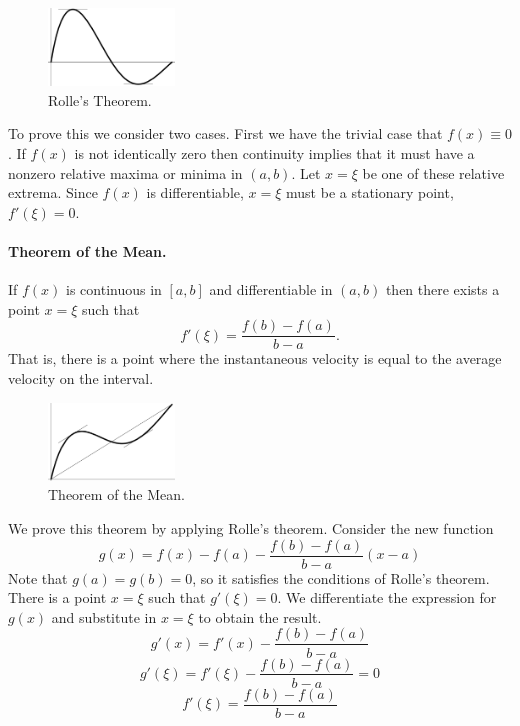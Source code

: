 \begin{figure}[h!]
  \begin{center}
    \includegraphics[width=0.3\textwidth]{calculus/differential/rolle}
  \end{center}
  \caption{Rolle's Theorem.}
  \label{rolle}
\end{figure}

To prove this we consider two cases.  First we have the 
trivial case that $f(x) \equiv 0$.  If $f(x)$ is not identically zero
then continuity implies that it must have a nonzero relative maxima or 
minima in $(a,b)$.  Let $x = \xi$ be one of these relative extrema.
Since $f(x)$ is differentiable, $x = \xi$ must be a stationary point,
$f'(\xi) = 0$.



\paragraph{Theorem of the Mean.}
If $f(x)$ is continuous in $[a,b]$ and differentiable in $(a,b)$ then there
exists a point $x = \xi$ such that
\[
f'(\xi) = \frac{f(b) - f(a)}{b - a}.
\]
That is, there is a point where the instantaneous velocity is equal to 
the average velocity on the interval.  

\begin{figure}[h!]
  \begin{center}
    \includegraphics[width=0.3\textwidth]{calculus/differential/themean}
  \end{center}
  \caption{Theorem of the Mean.}
  \label{themean}
\end{figure}

We prove this theorem by applying
Rolle's theorem.  Consider the new function
\[
g(x) = f(x) - f(a) - \frac{f(b) - f(a)}{b - a} (x - a)
\]
Note that $g(a) = g(b) = 0$, so it satisfies the conditions of Rolle's 
theorem.  There is a point $x = \xi$ such that $g'(\xi) = 0$.
We differentiate the expression for $g(x)$ and substitute in $x = \xi$ to 
obtain the result.
\[
g'(x) = f'(x)  - \frac{f(b) - f(a)}{b-a} 
\]
\[
g'(\xi) = f'(\xi)  - \frac{f(b) - f(a)}{b-a} = 0
\]
\[
f'(\xi)  = \frac{f(b) - f(a)}{b-a}
\]




